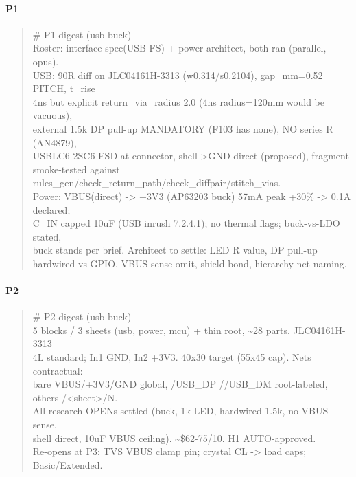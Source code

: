 \documentclass[11pt,a4paper]{article}
\begin{document}
\paragraph*{P1}
\begin{quote}\small\ttfamily\raggedright
\# P1 digest (usb-buck)\\
Roster: interface-spec(USB-FS) + power-architect, both ran (parallel, opus).\\
USB: 90R diff on JLC04161H-3313 (w0.314/s0.2104), gap\_mm=0.52 PITCH, t\_rise\\
4ns but explicit return\_via\_radius 2.0 (4ns radius=120mm would be vacuous),\\
external 1.5k DP pull-up MANDATORY (F103 has none), NO series R (AN4879),\\
USBLC6-2SC6 ESD at connector, shell-\textgreater{}GND direct (proposed), fragment\\
smoke-tested against rules\_gen/check\_return\_path/check\_diffpair/stitch\_vias.\\
Power: VBUS(direct) -\textgreater{} +3V3 (AP63203 buck) 57mA peak +30\% -\textgreater{} 0.1A declared;\\
C\_IN capped 10uF (USB inrush 7.2.4.1); no thermal flags; buck-vs-LDO stated,\\
buck stands per brief. Architect to settle: LED R value, DP pull-up\\
hardwired-vs-GPIO, VBUS sense omit, shield bond, hierarchy net naming.
\end{quote}
\paragraph*{P2}
\begin{quote}\small\ttfamily\raggedright
\# P2 digest (usb-buck)\\
5 blocks / 3 sheets (usb, power, mcu) + thin root, \textasciitilde{}28 parts. JLC04161H-3313\\
4L standard; In1 GND, In2 +3V3. 40x30 target (55x45 cap). Nets contractual:\\
bare VBUS/+3V3/GND global, /USB\_DP //USB\_DM root-labeled, others /\textless{}sheet\textgreater{}/N.\\
All research OPENs settled (buck, 1k LED, hardwired 1.5k, no VBUS sense,\\
shell direct, 10uF VBUS ceiling). \textasciitilde{}\$62-75/10. H1 AUTO-approved.\\
Re-opens at P3: TVS VBUS clamp pin; crystal CL -\textgreater{} load caps; Basic/Extended.
\end{quote}
\end{document}
